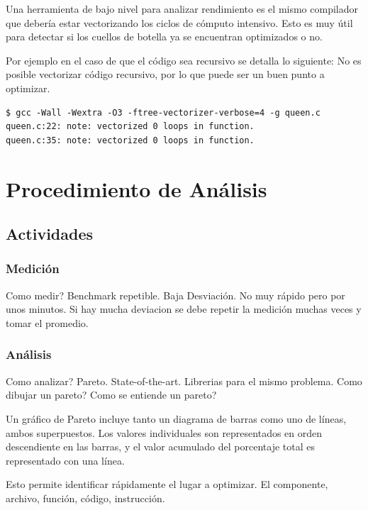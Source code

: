 \documentclass[a4paper]{report}
\begin{document}
Una herramienta de bajo nivel para analizar rendimiento es el mismo compilador
que deber\'ia estar vectorizando los ciclos de c\'omputo intensivo. Esto es muy
\'util para detectar si los cuellos de botella ya se encuentran optimizados o no.

\bigskip

Por ejemplo en el caso de que el c\'odigo sea recursivo se detalla lo siguiente:
No es posible vectorizar c\'odigo recursivo, por lo que puede ser un buen punto a
optimizar.

{\small
\begin{verbatim}
$ gcc -Wall -Wextra -O3 -ftree-vectorizer-verbose=4 -g queen.c
queen.c:22: note: vectorized 0 loops in function.
queen.c:35: note: vectorized 0 loops in function.
\end{verbatim}
}

\chapter{Procedimiento de An\'alisis}

\section{Actividades}

\subsection{Medici\'on}

Como medir? Benchmark repetible. Baja Desviaci\'on. No muy r\'apido pero por unos
minutos. Si hay mucha deviacion se debe repetir la medici\'on muchas veces y
tomar el promedio.

\subsection{An\'alisis}

Como analizar? Pareto. State-of-the-art. Librerias para el mismo problema.
Como dibujar un pareto? Como se entiende un pareto?

Un gr\'afico de Pareto incluye tanto un diagrama de barras como uno de l\'ineas, ambos superpuestos.
Los valores individuales son representados en orden descendiente en las barras, y el valor acumulado del porcentaje total es representado con una l\'inea.

Esto permite identificar r\'apidamente el lugar a optimizar. El componente, archivo, funci\'on, c\'odigo, instrucci\'on.
\end{document}

